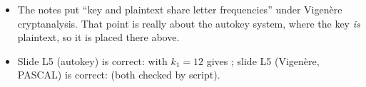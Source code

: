 \begin{fixbox}
\begin{itemize}
  \item The notes put ``key and plaintext share letter frequencies'' under Vigen\`ere cryptanalysis. That point is really about the autokey system, where the key \emph{is} plaintext, so it is placed there above.
  \item Slide L5 (autokey) is correct:  with $k_1 = 12$ gives ; slide L5 (Vigen\`ere, PASCAL) is correct:  (both checked by script).
\end{itemize}
\end{fixbox}
